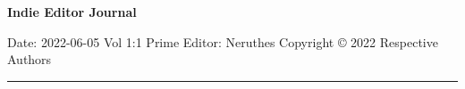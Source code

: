 \documentclass[a4paper,11pt]{article}
\begin{document}
\frenchspacing
\fboxsep=0pt

\begin{minipage}[t][6em][t]{\linewidth}
	\huge\fontsize{25pt}{25pt}\bfseries
	\center
	\vskip 5pt
		{Indie Editor Journal}\par\vfill
	\footnotesize\mdseries\sffamily
	Date: 2022-06-05 \hspace{1em} Vol 1:1 \hfill
	Prime Editor: Neruthes \hspace{1em} Copyright \copyright{} 2022 Respective Authors
\end{minipage}\par
\vskip 5pt\par
\rule{\linewidth}{1pt}\vskip 5pt
\end{document}
